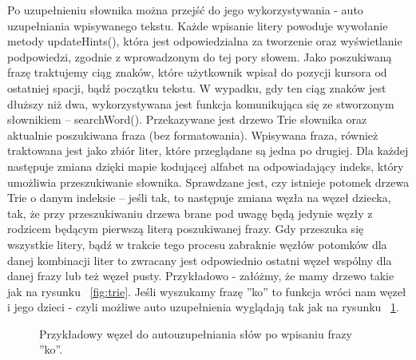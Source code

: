 \documentclass[twoside,a4paper]{book}
\begin{document}
Po uzupełnieniu słownika można przejść do jego wykorzystywania - auto uzupełniania wpisywanego tekstu.
Każde wpisanie litery powoduje wywołanie metody updateHints(), która jest odpowiedzialna za tworzenie oraz wyświetlanie podpowiedzi, zgodnie z wprowadzonym do tej pory słowem. Jako poszukiwaną frazę traktujemy ciąg znaków, które użytkownik wpisał do pozycji kursora od ostatniej spacji, bądź początku tekstu. W wypadku, gdy ten ciąg znaków jest dłuższy niż dwa, wykorzystywana jest funkcja komunikująca się ze stworzonym słownikiem – searchWord(). Przekazywane jest drzewo Trie słownika oraz aktualnie poszukiwana fraza (bez formatowania). 
Wpisywana fraza, również traktowana jest jako zbiór liter, które przeglądane są jedna po drugiej. Dla każdej następuje zmiana dzięki mapie kodującej alfabet na odpowiadający indeks, który umożliwia przeszukiwanie słownika. Sprawdzane jest, czy istnieje potomek drzewa Trie o danym indeksie – jeśli tak, to następuje zmiana węzła na węzeł dziecka, tak, że przy przeszukiwaniu drzewa brane pod uwagę będą jedynie węzły z rodzicem będącym pierwszą literą poszukiwanej frazy. Gdy przeszuka się wszystkie litery, bądź w trakcie tego procesu zabraknie węzłów potomków dla danej kombinacji liter to zwracany jest odpowiednio ostatni węzeł wspólny dla danej frazy lub też węzeł pusty. Przykładowo - załóżmy, że mamy drzewo takie jak na rysunku ~\ref{fig:trie}. Jeśli wyszukamy frazę ''ko'' to funkcja wróci nam węzeł i jego dzieci - czyli możliwe auto uzupełnienia wyglądają tak jak na rysunku ~\ref{fig:trieKO}.
\begin{figure}[!h]
		\centering
		\caption{Przykładowy węzeł do autouzupełniania słów po wpisaniu frazy ''ko''. }
		\label{fig:trieKO}
		\end{figure}
\end{document}
